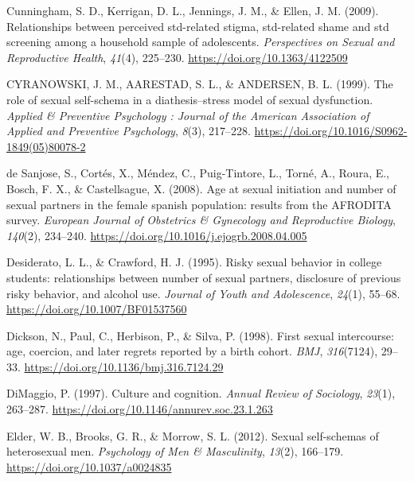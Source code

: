 \documentclass[
  donotrepeattitle,doc, 12pt, a4paper,floatsintext]{apa7}
\newlength{\cslhangindent}
\newlength{\cslentryspacingunit} %
\newenvironment{CSLReferences}[2] %
 {%
  \setlength{\parindent}{0pt}
  \ifodd #1
  \let\oldpar\par
  \def\par{\hangindent=\cslhangindent\oldpar}
  \fi
  \setlength{\parskip}{#2\cslentryspacingunit}
 }%
 {}
\begin{document}
\begin{CSLReferences}{1}{0}
\leavevmode{}%
Cunningham, S. D., Kerrigan, D. L., Jennings, J. M., \& Ellen, J. M. (2009). Relationships between perceived std-related stigma, std-related shame and std screening among a household sample of adolescents. \emph{Perspectives on Sexual and Reproductive Health}, \emph{41}(4), 225--230. \url{https://doi.org/10.1363/4122509}

\leavevmode{}%
CYRANOWSKI, J. M., AARESTAD, S. L., \& ANDERSEN, B. L. (1999). The role of sexual self-schema in a diathesis--stress model of sexual dysfunction. \emph{Applied \& Preventive Psychology : Journal of the American Association of Applied and Preventive Psychology}, \emph{8}(3), 217--228. \url{https://doi.org/10.1016/S0962-1849(05)80078-2}

\leavevmode{}%
de Sanjose, S., Cortés, X., Méndez, C., Puig-Tintore, L., Torné, A., Roura, E., Bosch, F. X., \& Castellsague, X. (2008). Age at sexual initiation and number of sexual partners in the female spanish population: results from the AFRODITA survey. \emph{European Journal of Obstetrics \& Gynecology and Reproductive Biology}, \emph{140}(2), 234--240. \url{https://doi.org/10.1016/j.ejogrb.2008.04.005}

\leavevmode{}%
Desiderato, L. L., \& Crawford, H. J. (1995). Risky sexual behavior in college students: relationships between number of sexual partners, disclosure of previous risky behavior, and alcohol use. \emph{Journal of Youth and Adolescence}, \emph{24}(1), 55--68. \url{https://doi.org/10.1007/BF01537560}

\leavevmode{}%
Dickson, N., Paul, C., Herbison, P., \& Silva, P. (1998). First sexual intercourse: age, coercion, and later regrets reported by a birth cohort. \emph{BMJ}, \emph{316}(7124), 29--33. \url{https://doi.org/10.1136/bmj.316.7124.29}

\leavevmode{}%
DiMaggio, P. (1997). Culture and cognition. \emph{Annual Review of Sociology}, \emph{23}(1), 263--287. \url{https://doi.org/10.1146/annurev.soc.23.1.263}

\leavevmode{}%
Elder, W. B., Brooks, G. R., \& Morrow, S. L. (2012). Sexual self-schemas of heterosexual men. \emph{Psychology of Men \& Masculinity}, \emph{13}(2), 166--179. \url{https://doi.org/10.1037/a0024835}


\end{CSLReferences}
\end{document}
